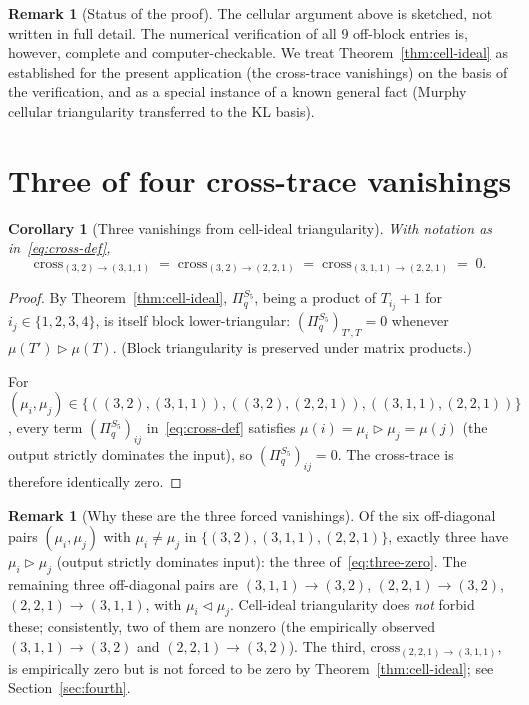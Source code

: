 \documentclass[11pt]{article}
\newtheorem{corollary}[theorem]{Corollary}
\theoremstyle{definition}
\newtheorem{remark}[theorem]{Remark}
\begin{document}
\begin{remark}[Status of the proof]\label{rem:proof-status}
The cellular argument above is sketched, not written in full detail. The numerical verification of all 9 off-block entries is, however, complete and computer-checkable. We treat Theorem~\ref{thm:cell-ideal} as established for the present application (the cross-trace vanishings) on the basis of the verification, and as a special instance of a known general fact (Murphy cellular triangularity transferred to the KL basis).
\end{remark}

\section{Three of four cross-trace vanishings}\label{sec:three-vanish}

\begin{corollary}[Three vanishings from cell-ideal triangularity]\label{cor:three}
With notation as in~\eqref{eq:cross-def},
\begin{equation}\label{eq:three-zero}
\mathrm{cross}_{(3,2)\to(3,1,1)} \;=\; \mathrm{cross}_{(3,2)\to(2,2,1)} \;=\; \mathrm{cross}_{(3,1,1)\to(2,2,1)} \;=\; 0.
\end{equation}
\end{corollary}

\begin{proof}
By Theorem~\ref{thm:cell-ideal}, $\Pi_q^{S_5}$, being a product of $T_{i_j}+1$ for $i_j \in \{1,2,3,4\}$, is itself block lower-triangular: $(\Pi_q^{S_5})_{T', T} = 0$ whenever $\mu(T') \triangleright \mu(T)$. (Block triangularity is preserved under matrix products.)

For $(\mu_i, \mu_j) \in \{((3,2),(3,1,1)), ((3,2),(2,2,1)), ((3,1,1),(2,2,1))\}$, every term $(\Pi_q^{S_5})_{ij}$ in~\eqref{eq:cross-def} satisfies $\mu(i) = \mu_i \triangleright \mu_j = \mu(j)$ (the output strictly dominates the input), so $(\Pi_q^{S_5})_{ij} = 0$. The cross-trace is therefore identically zero. \qedhere
\end{proof}

\begin{remark}[Why these are the three forced vanishings]\label{rem:these-three}
Of the six off-diagonal pairs $(\mu_i, \mu_j)$ with $\mu_i \neq \mu_j$ in $\{(3,2),(3,1,1),(2,2,1)\}$, exactly three have $\mu_i \triangleright \mu_j$ (output strictly dominates input): the three of~\eqref{eq:three-zero}. The remaining three off-diagonal pairs are $(3,1,1)\to(3,2)$, $(2,2,1)\to(3,2)$, $(2,2,1)\to(3,1,1)$, with $\mu_i \triangleleft \mu_j$. Cell-ideal triangularity does \emph{not} forbid these; consistently, two of them are nonzero (the empirically observed $(3,1,1)\to(3,2)$ and $(2,2,1)\to(3,2)$). The third, $\mathrm{cross}_{(2,2,1)\to(3,1,1)}$, is empirically zero but is not forced to be zero by Theorem~\ref{thm:cell-ideal}; see Section~\ref{sec:fourth}.
\end{remark}
\end{document}
